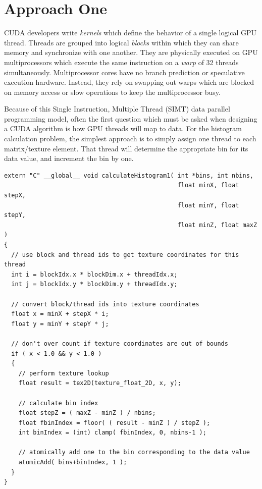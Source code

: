 \documentclass{article}
\begin{document}
\section{Approach One}\label{approach1}

CUDA developers write \emph{kernels} which define the behavior of a single logical GPU thread. Threads are grouped into logical \emph{blocks} within which they can share memory and synchronize with one another. They are physically executed on GPU multiprocessors which execute the same instruction on a \emph{warp} of 32 threads simultaneously. Multiprocessor cores have no branch prediction or speculative execution hardware. Instead, they rely on swapping out warps which are blocked on memory access or slow operations to keep the multiprocessor busy. 

Because of this Single Instruction, Multiple Thread (SIMT) data parallel programming model, often the first question which must be asked when designing a CUDA algorithm is how GPU threads will map to data. For the histogram calculation problem, the simplest approach is to simply assign one thread to each matrix/texture element. That thread will determine the appropriate bin for its data value, and increment the bin by one.

\lstset{language=C,basicstyle=\footnotesize}
\begin{minipage}{\textwidth}
\begin{lstlisting}[caption={calculateHistogram1: Global Memory atomicAdd},label={kernel1}]
extern "C" __global__ void calculateHistogram1( int *bins, int nbins,
                                                float minX, float stepX,
                                                float minY, float stepY,
                                                float minZ, float maxZ )
{
  // use block and thread ids to get texture coordinates for this thread
  int i = blockIdx.x * blockDim.x + threadIdx.x;
  int j = blockIdx.y * blockDim.y + threadIdx.y;

  // convert block/thread ids into texture coordinates
  float x = minX + stepX * i;
  float y = minY + stepY * j;

  // don't over count if texture coordinates are out of bounds
  if ( x < 1.0 && y < 1.0 )
  {
    // perform texture lookup
    float result = tex2D(texture_float_2D, x, y);

    // calculate bin index
    float stepZ = ( maxZ - minZ ) / nbins;
    float fbinIndex = floor( ( result - minZ ) / stepZ );
    int binIndex = (int) clamp( fbinIndex, 0, nbins-1 );

    // atomically add one to the bin corresponding to the data value
    atomicAdd( bins+binIndex, 1 );
  }
}
\end{lstlisting}
\end{minipage}
\end{document}
